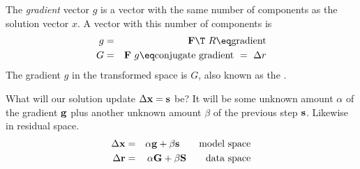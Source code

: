 \par
The {\it gradient} vector $g$ is a vector with the same number
of components as the solution vector $x$.
A vector with this number of components is
\begin{eqnarray}
g &=& \bold F\T \  R \eq \hbox{gradient}                 \label{eqn:g} \\
G &=& \bold F  \  g \eq \hbox{conjugate gradient}   \ =\ \Delta r     \label{eqn:G}
\end{eqnarray}
The gradient $g$ in the transformed space is $G$,
also known as the .
\par
What will our solution update $\Delta \bold x=\bold s$ be?
It will be some unknown amount $\alpha$ of the gradient $\bold g$ plus
another unknown amount         $\beta$  of the previous step $\bold s$.
Likewise in residual space.
\begin{eqnarray}
\Delta \bold x &=& \alpha \bold g + \beta \bold s \quad\quad \hbox{model space}
\\
\Delta \bold r &=& \alpha \bold G + \beta \bold S \quad\quad \hbox{data space}
\end{eqnarray}

